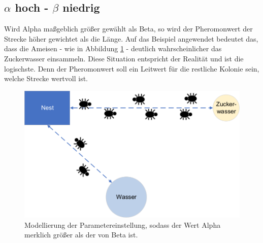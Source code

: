 {	\subsection{$\alpha$ hoch - $\beta$ niedrig}
	Wird Alpha maßgeblich größer gewählt als Beta, so wird der Pheromonwert der Strecke höher gewichtet als die Länge. Auf das Beispiel angewendet bedeutet das, dass die Ameisen - wie in Abbildung \ref{parameter_a>b} - deutlich wahrscheinlicher das Zuckerwasser einsammeln. Diese Situation entspricht der Realität und ist die logischste. Denn der Pheromonwert soll ein Leitwert für die restliche Kolonie sein, welche Strecke wertvoll ist.
	\begin{figure}[h]
		\centering
		\includegraphics[width=0.7\linewidth]{images/AntAlgorithm_alphaMbeta.png}
		\caption{Modellierung der Parametereinstellung, sodass der Wert Alpha merklich größer als der von Beta ist.}
		\label{parameter_a>b}
	\end{figure}
	
}
